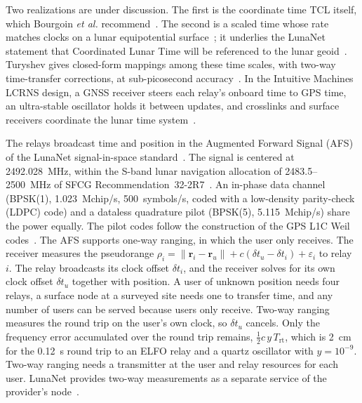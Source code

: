 \documentclass{IEEEoj}
\begin{document}
Two realizations are under discussion. The first is the coordinate time TCL itself, which Bourgoin \emph{et al.} recommend~\cite{bourgoin_ltc}. The second is a scaled time whose rate matches clocks on a lunar equipotential surface~\cite{ashby_lunar_time}; it underlies the LunaNet statement that Coordinated Lunar Time will be referenced to the lunar geoid~\cite{dafesh_afs}. Turyshev gives closed-form mappings among these time scales, with two-way time-transfer corrections, at sub-picosecond accuracy~\cite{turyshev_2026}. In the Intuitive Machines LCRNS design, a GNSS receiver steers each relay's onboard time to GPS time, an ultra-stable oscillator holds it between updates, and crosslinks and surface receivers coordinate the lunar time system~\cite{ansalone_lcrns_time}.

The relays broadcast time and position in the Augmented Forward Signal (AFS) of the LunaNet signal-in-space standard~\cite{lsis_afs}. The signal is centered at \SI{2492.028}{MHz}, within the S-band lunar navigation allocation of \SI{2483.5}{}--\SI{2500}{MHz} of SFCG Recommendation~32-2R7~\cite{sfcg_rec32}. An in-phase data channel (BPSK(1), \SI{1.023}{Mchip/s}, 500~symbols/s, coded with a low-density parity-check (LDPC) code) and a dataless quadrature pilot (BPSK(5), \SI{5.115}{Mchip/s}) share the power equally. The pilot codes follow the construction of the GPS L1C Weil codes~\cite{lsis_afs,gramling_lunanet_pnt}. The AFS supports one-way ranging, in which the user only receives. The receiver measures the pseudorange $\rho_i = \lVert \mathbf{r}_i - \mathbf{r}_u \rVert + c(\delta t_u - \delta t_i) + \varepsilon_i$ to relay~$i$. The relay broadcasts its clock offset $\delta t_i$, and the receiver solves for its own clock offset $\delta t_u$ together with position. A user of unknown position needs four relays, a surface node at a surveyed site needs one to transfer time, and any number of users can be served because users only receive. Two-way ranging measures the round trip on the user's own clock, so $\delta t_u$ cancels. Only the frequency error accumulated over the round trip remains, $\tfrac{1}{2} c\, y\, T_{\mathrm{rt}}$, which is \SI{2}{cm} for the \SI{0.12}{s} round trip to an ELFO relay and a quartz oscillator with $y = 10^{-9}$. Two-way ranging needs a transmitter at the user and relay resources for each user. LunaNet provides two-way measurements as a separate service of the provider's node~\cite{lnis_v5}.
\end{document}
